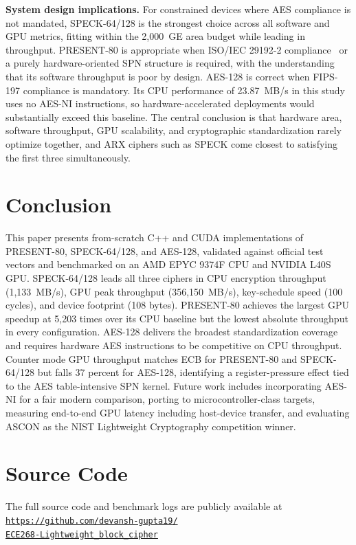 \documentclass[conference]{IEEEtran}
\begin{document}
\textbf{System design implications.} For constrained devices where AES compliance is not mandated,
SPECK-64/128 is the strongest choice across all software and GPU metrics, fitting within the
2,000~GE area budget while leading in throughput. PRESENT-80 is appropriate when ISO/IEC 29192-2
compliance~\cite{iso29192} or a purely hardware-oriented SPN structure is required, with the understanding that
its software throughput is poor by design. AES-128 is correct when FIPS-197 compliance is
mandatory. Its CPU performance of 23.87~MB/s in this study uses no AES-NI instructions, so
hardware-accelerated deployments would substantially exceed this baseline. The central conclusion
is that hardware area, software throughput, GPU scalability, and cryptographic standardization
rarely optimize together, and ARX ciphers such as SPECK come closest to satisfying the first
three simultaneously.

\section{Conclusion}

This paper presents from-scratch C++ and CUDA implementations of PRESENT-80, SPECK-64/128, and
AES-128, validated against official test vectors and benchmarked on an AMD EPYC 9374F CPU and
NVIDIA L40S GPU. SPECK-64/128 leads all three ciphers in CPU encryption throughput (1,133~MB/s),
GPU peak throughput (356,150~MB/s), key-schedule speed (100 cycles), and device footprint (108 bytes).
PRESENT-80 achieves the largest GPU speedup at 5,203 times over its CPU baseline but the lowest
absolute throughput in every configuration. AES-128 delivers the broadest standardization coverage
and requires hardware AES instructions to be competitive on CPU throughput. Counter mode GPU
throughput matches ECB for PRESENT-80 and SPECK-64/128 but falls 37 percent for AES-128, identifying
a register-pressure effect tied to the AES table-intensive SPN kernel. Future work includes
incorporating AES-NI for a fair modern comparison, porting to microcontroller-class targets,
measuring end-to-end GPU latency including host-device transfer, and evaluating ASCON as the NIST
Lightweight Cryptography competition winner.

\section*{Source Code}
\noindent\raggedright
The full source code and benchmark logs are publicly available at\\[2pt]
\href{https://github.com/devansh-gupta19/ECE268-Lightweight_block_cipher}{%
\small\texttt{https://github.com/devansh-gupta19/}}\\[1pt]
\href{https://github.com/devansh-gupta19/ECE268-Lightweight_block_cipher}{%
\small\texttt{ECE268-Lightweight\_block\_cipher}}\par
\end{document}
